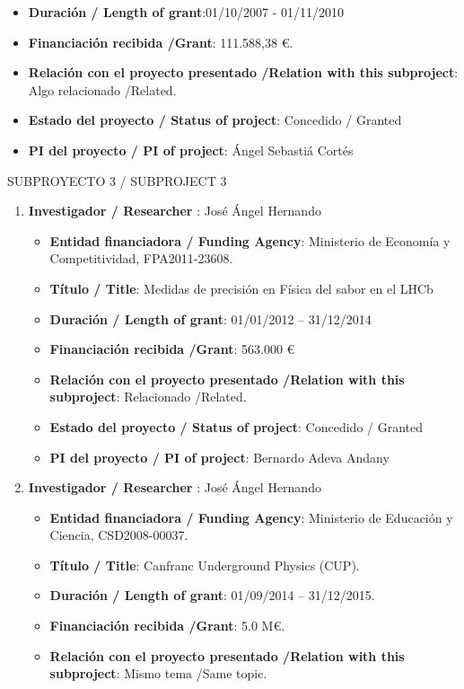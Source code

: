 \begin{enumerate}
\begin{itemize}
\item {\bf Duración / Length of grant}:01/10/2007 - 01/11/2010 
\item {\bf Financiación recibida /Grant}: 111.588,38 \euro. 
\item {\bf Relación con el proyecto presentado /Relation with this subproject}: Algo relacionado /Related. 
\item {\bf Estado del proyecto / Status of project}: Concedido / Granted
\item {\bf PI del proyecto / PI of project}: Ángel Sebastiá Cortés 
\end{itemize}
\end{enumerate}


{\sc SUBPROYECTO 3 / SUBPROJECT 3}

\begin{enumerate}
\item {\bf Investigador / Researcher }: José Ángel Hernando
\begin{itemize}
\item {\bf Entidad financiadora / Funding Agency}: Ministerio de Econom\'ia y Competitividad, FPA2011-23608.  
\item {\bf Título / Title}:  Medidas de precisi\'on en F\'isica del sabor en el LHCb
\item {\bf Duración / Length of grant}: 01/01/2012 -- 31/12/2014
\item {\bf Financiación recibida /Grant}: 563.000 \euro 
\item {\bf Relación con el proyecto presentado /Relation with this subproject}: Relacionado /Related. 
\item {\bf Estado del proyecto / Status of project}: Concedido / Granted
\item {\bf PI del proyecto / PI of project}: Bernardo Adeva Andany
\end{itemize}
\item {\bf Investigador / Researcher }: José Ángel Hernando
\begin{itemize}
\item {\bf Entidad financiadora / Funding Agency}: Ministerio de Educaci\'on y Ciencia, CSD2008-00037.
\item {\bf Título / Title}:  Canfranc Underground Physics (CUP).
\item {\bf Duración / Length of grant}: 01/09/2014 -- 31/12/2015. 
\item {\bf Financiación recibida /Grant}: 5.0 M\euro. 
\item {\bf Relación con el proyecto presentado /Relation with this subproject}: Mismo tema /Same topic. 

\end{itemize}
\end{enumerate}
